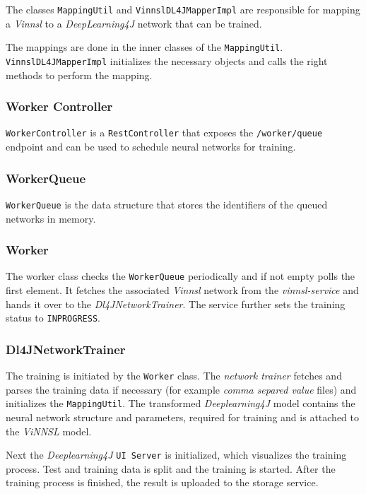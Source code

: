 The classes \texttt{MappingUtil} and \texttt{VinnslDL4JMapperImpl} are
responsible for mapping a \emph{Vinnsl} to a \emph{DeepLearning4J}
network that can be trained.

The mappings are done in the inner classes of the \texttt{MappingUtil}.
\texttt{VinnslDL4JMapperImpl} initializes the necessary objects and
calls the right methods to perform the mapping.

\subsubsection{Worker Controller}\label{worker-controller}

\texttt{WorkerController} is a \texttt{RestController} that exposes the
\texttt{/worker/queue} endpoint and can be used to schedule neural
networks for training.

\subsubsection{WorkerQueue}\label{workerqueue}

\texttt{WorkerQueue} is the data structure that stores the identifiers
of the queued networks in memory.

\subsubsection{Worker}\label{worker}

The worker class checks the \texttt{WorkerQueue} periodically and if not
empty polls the first element. It fetches the associated \emph{Vinnsl}
network from the \emph{vinnsl-service} and hands it over to the
\emph{Dl4JNetworkTrainer}. The service further sets the training status
to \texttt{INPROGRESS}.

\subsubsection{Dl4JNetworkTrainer}\label{dl4jnetworktrainer}

The training is initiated by the \texttt{Worker} class. The
\emph{network trainer} fetches and parses the training data if necessary
(for example \emph{comma separed value} files) and initializes the
\texttt{MappingUtil}. The transformed \emph{Deeplearning4J} model
contains the neural network structure and parameters, required for
training and is attached to the \emph{ViNNSL} model.

Next the \emph{Deeplearning4J} \texttt{UI\ Server} is initialized, which
visualizes the training process. Test and training data is split and the
training is started. After the training process is finished, the result
is uploaded to the storage service.

